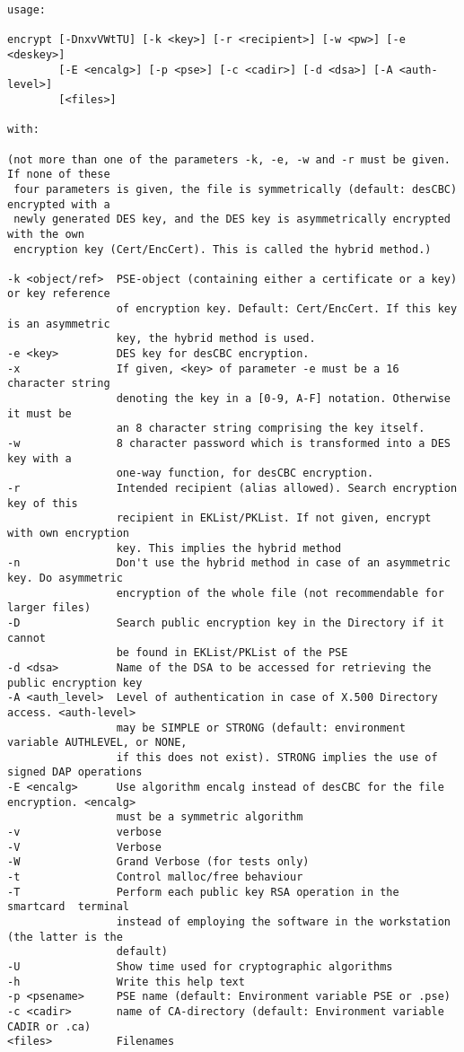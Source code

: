 {\begin{verbatim}
usage:

encrypt [-DnxvVWtTU] [-k <key>] [-r <recipient>] [-w <pw>] [-e <deskey>] 
        [-E <encalg>] [-p <pse>] [-c <cadir>] [-d <dsa>] [-A <auth-level>]
        [<files>]

with:

(not more than one of the parameters -k, -e, -w and -r must be given. If none of these 
 four parameters is given, the file is symmetrically (default: desCBC) encrypted with a  
 newly generated DES key, and the DES key is asymmetrically encrypted with the own 
 encryption key (Cert/EncCert). This is called the hybrid method.)

-k <object/ref>  PSE-object (containing either a certificate or a key) or key reference 
                 of encryption key. Default: Cert/EncCert. If this key is an asymmetric
                 key, the hybrid method is used.
-e <key>         DES key for desCBC encryption.
-x               If given, <key> of parameter -e must be a 16 character string
                 denoting the key in a [0-9, A-F] notation. Otherwise it must be
                 an 8 character string comprising the key itself.
-w               8 character password which is transformed into a DES key with a
                 one-way function, for desCBC encryption.
-r               Intended recipient (alias allowed). Search encryption key of this 
                 recipient in EKList/PKList. If not given, encrypt with own encryption 
                 key. This implies the hybrid method
-n               Don't use the hybrid method in case of an asymmetric key. Do asymmetric
                 encryption of the whole file (not recommendable for larger files)
-D               Search public encryption key in the Directory if it cannot
                 be found in EKList/PKList of the PSE
-d <dsa>         Name of the DSA to be accessed for retrieving the public encryption key
-A <auth_level>  Level of authentication in case of X.500 Directory access. <auth-level>
                 may be SIMPLE or STRONG (default: environment variable AUTHLEVEL, or NONE,
                 if this does not exist). STRONG implies the use of signed DAP operations
-E <encalg>      Use algorithm encalg instead of desCBC for the file encryption. <encalg>
                 must be a symmetric algorithm
-v               verbose
-V               Verbose
-W               Grand Verbose (for tests only)
-t               Control malloc/free behaviour
-T               Perform each public key RSA operation in the smartcard  terminal
                 instead of employing the software in the workstation (the latter is the 
                 default)
-U               Show time used for cryptographic algorithms
-h               Write this help text
-p <psename>     PSE name (default: Environment variable PSE or .pse)
-c <cadir>       name of CA-directory (default: Environment variable CADIR or .ca)
<files>          Filenames


\end{verbatim}}

